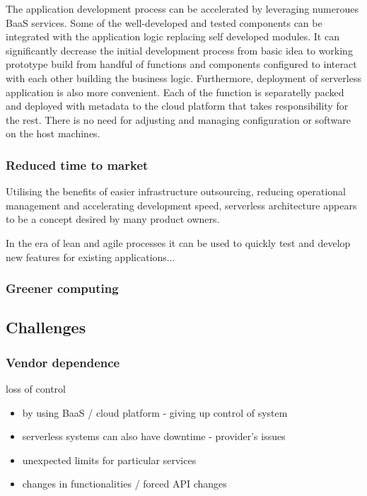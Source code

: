 The application development process can be accelerated by leveraging numeroues BaaS services. Some of the well-developed and tested components can be integrated with the application logic replacing self developed modules. 
It can significantly decrease the initial development process from basic idea to working prototype build from handful of functions and components configured to interact with each other building the business logic. 
Furthermore, deployment of serverless application is also more convenient. Each of the function is separatelly packed and deployed with metadata to the cloud platform that takes responsibility for the rest. There is no need for adjusting and managing configuration or software on the host machines.

\subsubsection*{Reduced time to market}

Utilising the benefits of easier infrastructure outsourcing, reducing operational management and accelerating development speed, serverless architecture appears to be a concept desired by many product owners. 

In the era of lean and agile processes it can be used to quickly test and develop new features for existing applications... %


\subsubsection*{Greener computing}


\subsection{Challenges}

\subsubsection*{Vendor dependence}

loss of control

\begin{itemize}
    \item by using BaaS / cloud platform - giving up control of system
    \item serverless systems can also have downtime - provider's issues
    \item unexpected limits for particular services
    \item changes in functionalities / forced API changes
\end{itemize}

